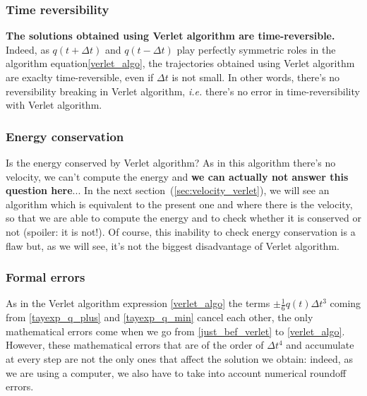     \subsubsection{Time reversibility}
    \textbf{The solutions obtained using Verlet algorithm are time-reversible.} Indeed, as $q(t+\Delta t)$ and $q(t-\Delta t)$ play perfectly symmetric roles in the algorithm equation\eqref{verlet_algo}, the trajectories obtained using Verlet algorithm are exaclty time-reversible, even if $\Delta t$ is not small. In other words, there's no reversibility breaking in Verlet algorithm, \textit{i.e.} there's no error in time-reversibility with Verlet algorithm.
    
    \subsubsection{Energy conservation}
    Is the energy conserved by Verlet algorithm? As in this algorithm there's no velocity, we can't compute the energy and \textbf{we can actually not answer this question here}... In the next section~(\ref{sec:velocity_verlet}), we will see an algorithm which is equivalent to the present one and where there is the velocity, so that we are able to compute the energy and to check whether it is conserved or not (spoiler: it is not!). Of course, this inability to check energy conservation is a flaw but, as we will see, it's not the biggest disadvantage of Verlet algorithm.
    
    \subsubsection{Formal errors}
    As in the Verlet algorithm expression \eqref{verlet_algo} the terms $\pm \frac{1}{6}q(t)\Delta t^3$ coming from \eqref{tayexp_q_plus} and \eqref{tayexp_q_min} cancel each other, the only mathematical errors come when we go from \eqref{just_bef_verlet} to \eqref{verlet_algo}. However, these mathematical errors that are of the order of $\Delta t^4$ and accumulate at every step are not the only ones that affect the solution we obtain: indeed, as we are using a computer, we also have to take into account numerical roundoff errors.
    
